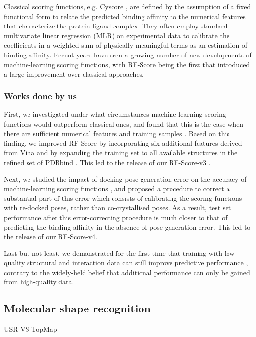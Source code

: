 \documentclass[a4paper,12pt]{article}
\begin{document}
Classical scoring functions, e.g. Cyscore \citep{1372}, are defined by the assumption of a fixed functional form to relate the predicted binding affinity to the numerical features that characterize the protein-ligand complex. They often employ standard multivariate linear regression (MLR) on experimental data to calibrate the coefficients in a weighted sum of physically meaningful terms as an estimation of binding affinity. Recent years have seen a growing number of new developments of machine-learning scoring functions, with RF-Score \citep{564} being the first that introduced a large improvement over classical approaches.

\subsubsection*{Works done by us}

First, we investigated under what circumstances machine-learning scoring functions would outperform classical ones, and found that this is the case when there are sufficient numerical features and training samples \citep{1432}. Based on this finding, we improved RF-Score by incorporating six additional features derived from Vina \citep{595} and by expanding the training set to all available structures in the refined set of PDBbind \citep{1633}. This led to the release of our RF-Score-v3 \citep{1647}.

Next, we studied the impact of docking pose generation error on the accuracy of machine-learning scoring functions \citep{1434}, and proposed a procedure to correct a substantial part of this error which consists of calibrating the scoring functions with re-docked poses, rather than co-crystallised poses. As a result, test set performance after this error-correcting procedure is much closer to that of predicting the binding affinity in the absence of pose generation error. This led to the release of our RF-Score-v4.

Last but not least, we demonstrated for the first time that training with low-quality structural and interaction data can still improve predictive performance \citep{1663}, contrary to the widely-held belief that additional performance can only be gained from high-quality data.

\subsection*{Molecular shape recognition}

USR-VS \citep{1749}
TopMap \citep{1675}
\end{document}
